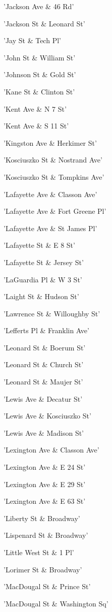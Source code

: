 \documentclass[11pt]{article}
\begin{document}
\begin{enumerate*}
\item 'Jackson Ave \& 46 Rd'
\item 'Jackson St \& Leonard St'
\item 'Jay St \& Tech Pl'
\item 'John St \& William St'
\item 'Johnson St \& Gold St'
\item 'Kane St \& Clinton St'
\item 'Kent Ave \& N 7 St'
\item 'Kent Ave \& S 11 St'
\item 'Kingston Ave \& Herkimer St'
\item 'Kosciuszko St \& Nostrand Ave'
\item 'Kosciuszko St \& Tompkins Ave'
\item 'Lafayette Ave \& Classon Ave'
\item 'Lafayette Ave \& Fort Greene Pl'
\item 'Lafayette Ave \& St James Pl'
\item 'Lafayette St \& E 8 St'
\item 'Lafayette St \& Jersey St'
\item 'LaGuardia Pl \& W 3 St'
\item 'Laight St \& Hudson St'
\item 'Lawrence St \& Willoughby St'
\item 'Lefferts Pl \& Franklin Ave'
\item 'Leonard St \& Boerum St'
\item 'Leonard St \& Church St'
\item 'Leonard St \& Maujer St'
\item 'Lewis Ave \& Decatur St'
\item 'Lewis Ave \& Kosciuszko St'
\item 'Lewis Ave \& Madison St'
\item 'Lexington Ave \& Classon Ave'
\item 'Lexington Ave \& E 24 St'
\item 'Lexington Ave \& E 29 St'
\item 'Lexington Ave \& E 63 St'
\item 'Liberty St \& Broadway'
\item 'Lispenard St \& Broadway'
\item 'Little West St \& 1 Pl'
\item 'Lorimer St \& Broadway'
\item 'MacDougal St \& Prince St'
\item 'MacDougal St \& Washington Sq'

\end{enumerate*}
\end{document}
